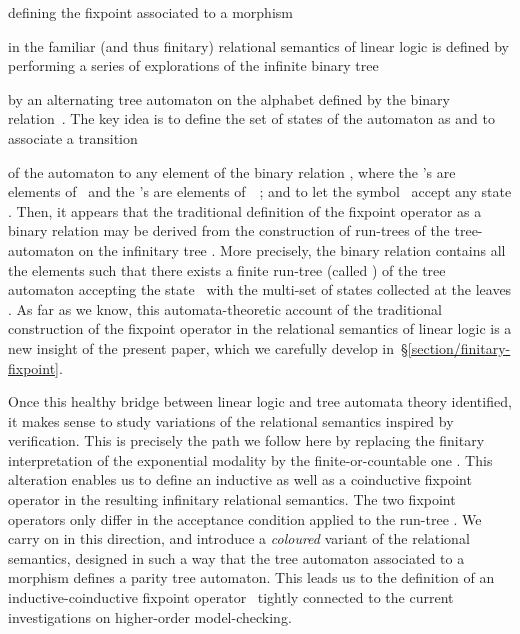 \documentclass[runningheads,a4paper]{llncs}
\begin{document}
defining the fixpoint  associated to a morphism

in the familiar (and thus finitary) relational semantics of linear logic 
is defined by performing a series of explorations of the infinite binary tree

by an alternating tree automaton 
on the alphabet  defined by the binary relation~.
The key idea is to define the set of states of the automaton as  and to associate a transition 


\noindent
of the automaton to any element  of the binary relation ,
where the 's are elements of~ and the 's are elements of~~;
and to let the symbol~ accept any state .
Then, it appears that the traditional definition of the fixpoint operator  as a binary relation 
may be derived from the construction of run-trees of the tree-automaton 
on the infinitary tree .
More precisely, the binary relation  contains all the elements 
such that there exists a finite run-tree (called ) of the tree automaton 
accepting the state~ with the multi-set of states  collected at the leaves .
As far as we know, this automata-theoretic account of the traditional construction of the fixpoint operator  
in the relational semantics of linear logic is a new insight of the present paper, which we carefully develop in~\S\ref{section/finitary-fixpoint}.


\medbreak

Once this healthy bridge between linear logic and tree automata theory identified,
it makes sense to study variations of the relational semantics inspired by verification.
This is precisely the path we follow here by replacing the finitary interpretation 
of the exponential modality by the finite-or-countable one .
This alteration enables us to define an inductive as well as a coinductive fixpoint operator 
in the resulting infinitary relational semantics.
The two fixpoint operators only differ in the acceptance condition applied to the run-tree .
We carry on in this direction, and introduce a \emph{coloured} variant of the relational semantics,
designed in such a way that the tree automaton 
associated to a morphism  defines a parity tree automaton.
This leads us to the definition of an inductive-coinductive fixpoint operator~
tightly connected to the current investigations on higher-order model-checking.
\end{document}
